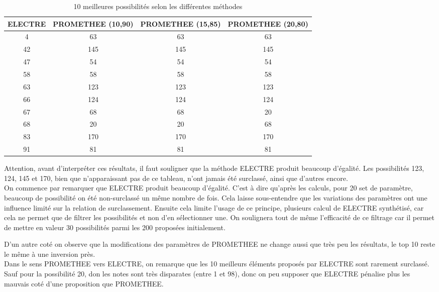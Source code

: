 \documentclass[12pt,a4paper]{article}
\begin{document}
\begin{table}[!h]
\centering
\begin{tabular}{|*{4}{c|}}
  \hline
  ELECTRE & PROMETHEE (10,90) & PROMETHEE (15,85) & PROMETHEE (20,80) \\
  \hline
	4 & 63 & 63 & 63 \\
	42 & 145 & 145 & 145 \\
	47 & 54 & 54 & 54 \\
	58 & 58 & 58 & 58 \\
	63 & 123 & 123 & 123 \\
	66 & 124 & 124 & 124 \\
	67 & 68 & 68 & 20 \\
	68 & 20 & 20 & 68 \\
	83 & 170 & 170 & 170 \\
	91 & 81 & 81 & 81 \\
  \hline
\end{tabular}
\caption{10 meilleures possibilités selon les différentes méthodes}
\label{10best}
\end{table}
Attention, avant d’interpréter ces résultats, il faut souligner que la méthode ELECTRE produit beaucoup d'égalité. Les possibilités 123, 124, 145 et 170, bien que n'apparaissant pas de ce tableau, n'ont jamais été surclassé, ainsi que d'autres encore.\\

On commence par remarquer que ELECTRE produit beaucoup d'égalité. C'est à dire qu'après les calculs, pour 20 set de paramètre, beaucoup de possibilité on été non-surclassé un même nombre de fois. Cela laisse sous-entendre que les variations des paramètres ont une influence limité sur la relation de surclassement. Ensuite cela limite l'usage de ce principe, plusieurs calcul de ELECTRE synthétisé, car cela ne permet que de filtrer les possibilités et non d'en sélectionner une. On soulignera tout de même l'efficacité de ce filtrage car il permet de mettre en valeur 30 possibilités parmi les 200 proposées initialement.

D'un autre coté on observe que la modifications des paramètres de PROMETHEE ne change aussi que très peu les résultats, le top 10 reste le même à une inversion près.\\

Dans le sens PROMETHEE vers ELECTRE, on remarque que les 10 meilleurs éléments proposés par ELECTRE sont rarement surclassé. Sauf pour la possibilité 20, don les notes sont très disparates (entre 1 et 98), donc on peu supposer que ELECTRE pénalise plus les mauvais coté d'une proposition que PROMETHEE.
\end{document}
